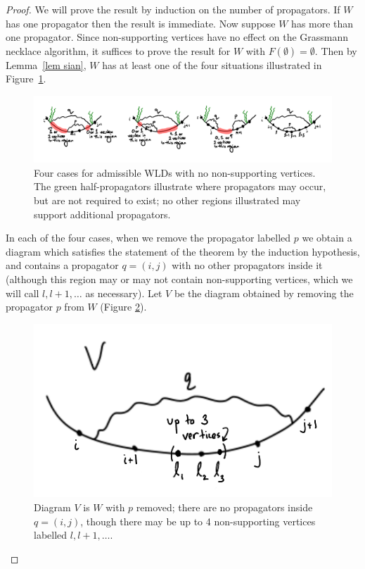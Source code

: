 \documentclass[11pt]{article}
\theoremstyle{remark}
\theoremstyle{definition}
\begin{document}
\begin{proof}
We will prove the result by induction on the number of propagators.  If $W$ has one propagator then the result is immediate.  Now suppose $W$ has more than one propagator.  Since non-supporting vertices have no effect on the Grassmann necklace algorithm, it suffices to prove the result for $W$ with $F(\emptyset) = \emptyset$.  Then by Lemma~\ref{lem sian}, $W$ has at least one of the four situations illustrated in Figure~\ref{fig 3 cases}.

\begin{figure}
    \includegraphics[scale=0.8]{3cases}
    \caption{Four cases for admissible WLDs with no non-supporting vertices. The green half-propagators illustrate where propagators may occur, but are not required to exist; no other regions illustrated may support additional propagators.}\label{fig 3 cases}
  \end{figure}


In each of the four cases, when we remove the propagator labelled $p$ we obtain a diagram which satisfies the statement of the theorem by the induction hypothesis, and contains a propagator ${q = (i,j)}$ with no other propagators inside it (although this region may or may not contain non-supporting vertices, which we will call $l, l+1, \ldots$ as necessary). Let $V$ be the diagram obtained by removing the propagator $p$ from $W$ (Figure \ref{fig V diagram}). 


\begin{figure}
\includegraphics[scale=0.8]{Vdiagram_modified}
\caption{Diagram $V$ is $W$ with $p$ removed; there are no propagators inside $q = (i,j)$, though there may be up to 4 non-supporting vertices labelled $l, l+1, \ldots$.}
\label{fig V diagram}
\end{figure}



\end{proof}
\end{document}
